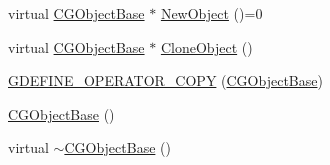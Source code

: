 \begin{DoxyCompactItemize}
\item 
virtual \hyperlink{class_c_g_object_base}{C\+G\+Object\+Base} $\ast$ \hyperlink{class_c_g_object_base_a14ca7edeeaecae626ca3189c18ead188}{New\+Object} ()=0
\item 
virtual \hyperlink{class_c_g_object_base}{C\+G\+Object\+Base} $\ast$ \hyperlink{class_c_g_object_base_a6aa27001d4a461227fcc4f2736fd6a36}{Clone\+Object} ()
\item 
\hyperlink{class_c_g_object_base_a1af9652a9c4ffb6ed32e1f2f59812fa6}{G\+D\+E\+F\+I\+N\+E\+\_\+\+O\+P\+E\+R\+A\+T\+O\+R\+\_\+\+C\+O\+P\+Y} (\hyperlink{class_c_g_object_base}{C\+G\+Object\+Base})
\item 
\hyperlink{class_c_g_object_base_a19ea40d42123eccd1495daf1fdb2e180}{C\+G\+Object\+Base} ()
\item 
virtual \hyperlink{class_c_g_object_base_a7c9135ab34eea2abeb5e03eb30ef2ad6}{$\sim$\+C\+G\+Object\+Base} ()
\end{DoxyCompactItemize}
